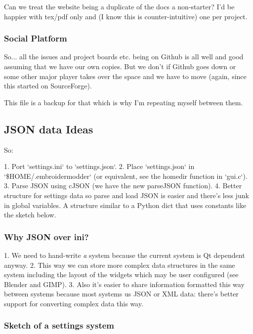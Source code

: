 \documentclass[11pt]{report}
\begin{document}
Can we treat the website being a duplicate of the docs a non-starter?
I'd be happier with tex/pdf only and (I know this is counter-intuitive)
one per project.

\subsubsection{Social Platform}

So... all the issues and project boards etc. being on Github is all
well and good assuming that we have our own copies. But we don't if
Github goes down or some other major player takes over the space and we
have to move (again, since this started on SourceForge).

This file is a backup for that which is why I'm repeating myself between
them.

\subsection{JSON data Ideas}

So:

1. Port `settings.ini` to `settings.json`.
2. Place `settings.json` in `\$HOME/.embroidermodder` (or equivalent, see the homedir function in `gui.c`).
3. Parse JSON using cJSON (we have the new parseJSON function).
4. Better structure for settings data so parse and load JSON is easier and
   there's less junk in global variables. A structure similar to a Python dict
   that uses constants like the sketch below.

\subsubsection{Why JSON over ini?}

1. We need to hand-write \emph{a} system because the current system is Qt dependent anyway.
2. This way we can store more complex data structures in the same system including the layout of the widgets which may be user configured (see Blender and GIMP).
3. Also it's easier to share information formatted this way between systems because most systems us JSON or XML data: there's better support for converting complex data this way.

\subsubsection{Sketch of a settings system}
\end{document}
